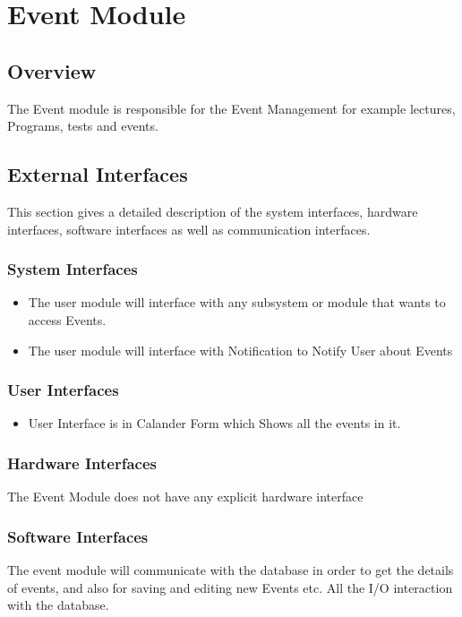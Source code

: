 \section{Event Module}
\subsection{Overview}
The Event module is responsible for the Event Management for example lectures, Programs, tests and events.
 
\subsection{External Interfaces}
This section gives a detailed description of the system interfaces, hardware interfaces, software interfaces as well as communication interfaces. 

	\subsubsection{System Interfaces}
		\begin{itemize}
			\item The user module will interface with any subsystem or module that wants to access Events.

			\item  The user module will interface with Notification to Notify User about Events
		
		\end{itemize}
	\subsubsection{User Interfaces }
	\begin{itemize} 

	\item User Interface is in Calander Form which Shows all the events in it.

 \end{itemize}
 
	\subsubsection{Hardware Interfaces }
	The Event Module does not have any explicit hardware interface

	\subsubsection{Software Interfaces } 
	The event module will communicate with the database in order to get the details of events, and also for saving and editing new Events etc. All the I/O interaction with the database.
